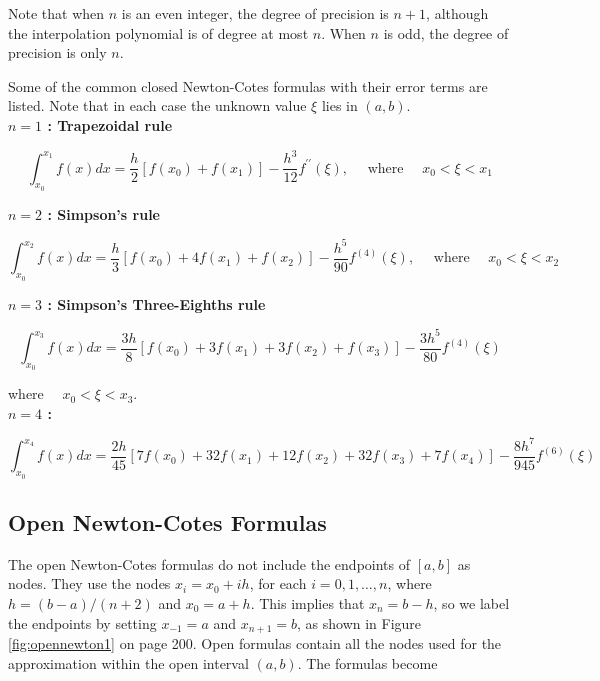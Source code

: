 Note that when $n$ is an even integer, the degree of precision is $n+1$, although the interpolation polynomial is of degree at most $n$. When $n$ is odd, the degree of precision is only $n$.

Some of the common closed Newton-Cotes formulas with their error terms are listed. Note that in each case the unknown value $\xi$ lies in $(a, b)$.\\
{\bf $n=1$ : Trapezoidal rule}


\begin{equation}\label{eqn:closednewtontrap}
\int_{x_{0}}^{x_{1}} f(x) d x=\frac{h}{2}\left[f\left(x_{0}\right)+f\left(x_{1}\right)\right]-\frac{h^{3}}{12} f^{\prime \prime}(\xi), \quad \text { where } \quad x_{0}<\xi<x_{1} 
\end{equation}


{\bf $n=2$ : Simpson's rule}


\begin{equation}\label{eqn:closednewtonsim}
\int_{x_{0}}^{x_{2}} f(x) d x=\frac{h}{3}\left[f\left(x_{0}\right)+4 f\left(x_{1}\right)+f\left(x_{2}\right)\right]-\frac{h^{5}}{90} f^{(4)}(\xi), \quad \text { where } \quad x_{0}<\xi<x_{2} 
\end{equation}


{\bf $n=3$ : Simpson's Three-Eighths rule}


\begin{equation}\label{eqn:clsednewtonsimpsonnis3}
\int_{x_{0}}^{x_{3}} f(x) d x=\frac{3 h}{8}\left[f\left(x_{0}\right)+3 f\left(x_{1}\right)+3 f\left(x_{2}\right)+f\left(x_{3}\right)\right]-\frac{3 h^{5}}{80} f^{(4)}(\xi)
\end{equation}


where $\quad x_{0}<\xi<x_{3}$.\\
{\bf $n=4$ :}


\begin{equation}\label{eqn:clsednewtonsimpsonnis4}
\int_{x_{0}}^{x_{4}} f(x) d x=\frac{2 h}{45}\left[7 f\left(x_{0}\right)+32 f\left(x_{1}\right)+12 f\left(x_{2}\right)+32 f\left(x_{3}\right)+7 f\left(x_{4}\right)\right]-\frac{8 h^{7}}{945} f^{(6)}(\xi)
\end{equation}


\subsection*{Open Newton-Cotes Formulas}
The open Newton-Cotes formulas do not include the endpoints of $[a, b]$ as nodes. They use the nodes $x_{i}=x_{0}+i h$, for each $i=0,1, \ldots, n$, where $h=(b-a) /(n+2)$ and $x_{0}=a+h$. This implies that $x_{n}=b-h$, so we label the endpoints by setting $x_{-1}=a$ and $x_{n+1}=b$, as shown in Figure \ref{fig:opennewton1} on page 200. Open formulas contain all the nodes used for the approximation within the open interval $(a, b)$. The formulas become

